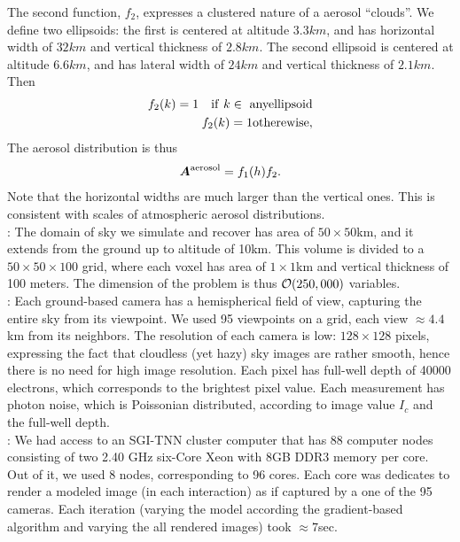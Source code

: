 \documentclass[10pt,twocolumn,letterpaper]{article}
\newcommand{\mat}[1]{\bm{#1}}
\begin{document}
The second function, $f_2$, expresses a clustered nature of a aerosol ``clouds''. We define two ellipsoids: the first is centered at altitude
$3.3km$, and has horizontal width of $32km$ and vertical thickness of $2.8km$. The second ellipsoid is centered at altitude $6.6km$, and has lateral width of $24km$ and vertical thickness of $2.1km$. Then
\begin{align}
 f_2(k) = 1 {\rm ~~~if~} k\in {\rm ~any ellipsoid}\\
 f_2(k) = 1 {\rm otherewise},
\end{align}
The aerosol distribution is thus
\begin{align}
  \mat{A}^{\rm aerosol}=f_1(h)f_2.
\end{align}
Note that the horizontal widths are much larger than the vertical ones. This is consistent with scales of atmospheric aerosol distributions.\\

: The domain of sky we simulate and recover has area of $50\times 50$km, and it extends from the ground up to altitude of 10km. This volume is divided to a $50\times50\times100$ grid, where each voxel has area of $1\times1$km and vertical thickness of 100 meters. The dimension of the problem is thus ${\cal O}(250,000)$ variables.\\

: Each ground-based camera has a hemispherical field of view, capturing the entire sky from its viewpoint. We used 95 viewpoints on a grid, each view $\approx 4.4$km from its neighbors.
The resolution of each camera is low: $128\times 128$ pixels, expressing the fact that cloudless (yet hazy) sky images are rather smooth, hence there is no need for high image resolution. Each pixel has full-well depth of 40000 electrons, which corresponds to the brightest pixel value. Each measurement has photon noise, which is Poissonian distributed, according to image value $I_c$ and the full-well depth.\\

: We had access to an SGI-TNN cluster computer that has 88 computer nodes consisting of two 2.40 GHz six-Core Xeon with 8GB
DDR3 memory per core. Out of it, we used 8 nodes, corresponding to 96 cores. Each core was dedicates to render a modeled image (in each interaction) as if captured by a one of the 95 cameras. Each iteration (varying the model according the gradient-based algorithm and varying the all rendered images) took $\approx 7$sec.\\
\end{document}
